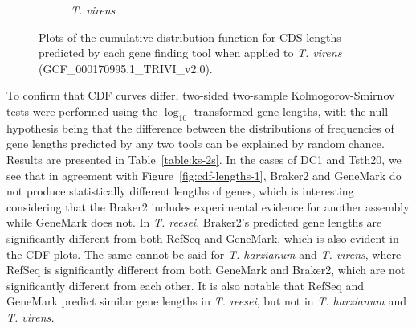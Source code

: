 \begin{figure}
  \centering
  \begin{subfigure}{\textwidth}
    \label{fig:tvirens-lengths}
    \caption{\textit{T. virens}}
  \end{subfigure}
  \caption[CDF plots for \textit{T. virens}]{Plots of the cumulative distribution
    function for CDS lengths predicted by each gene finding tool when
    applied to \textit{T. virens} (GCF\_000170995.1\_TRIVI\_v2.0).}\label{fig:cdf-lengths-3}
\end{figure}

To confirm that CDF curves differ, two-sided two-sample
Kolmogorov-Smirnov\cite{2008} tests were performed using the
$\log_{10}$ transformed gene lengths, with the null hypothesis being
that the difference between the distributions of frequencies of gene lengths predicted by
 any two tools can be explained by random chance. Results are presented in Table~\ref{table:ks-2s}. In the cases of DC1 and Tsth20, we see that in
agreement with Figure~\ref{fig:cdf-lengths-1}, Braker2 and GeneMark do
not produce statistically different lengths of genes, which is
interesting considering that the Braker2 includes experimental
evidence for another assembly while GeneMark does not. In
\textit{T. reesei}, Braker2's predicted gene lengths are significantly
different from both RefSeq and GeneMark, which is also evident in the
CDF plots. The same cannot be said for \textit{T. harzianum} and
\textit{T. virens}, where RefSeq is significantly different from both
GeneMark and Braker2, which are not significantly different from each
other. It is also notable that RefSeq and GeneMark predict similar
gene lengths in \textit{T. reesei}, but not in \textit{T. harzianum}
and \textit{T. virens.}

